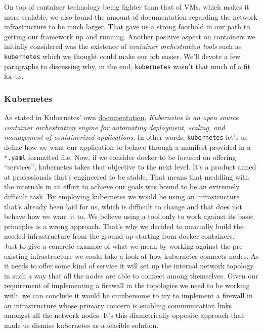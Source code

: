                 On top of container technology being lighter than that of VMs, which makes it more scalable, we also found the amount of documentation regarding the network infrastructure to be much larger. That gave us a strong foothold in our path to getting our framework up and running. Another positive aspect on containers we initially considered was the existence of \textit{container orchestration tools} such as \texttt{kubernetes} which we thought could make our job easier. We'll devote a few paragraphs to discussing why, in the end, \texttt{kubernetes} wasn't that much of a fit for us.

            \subsubsection{Kubernetes}
                As stated in Kubernetes' own \href{https://kubernetes.io/docs/home/}{documentation}, \textit{Kubernetes is an open source container orchestration engine for automating deployment, scaling, and management of containerized applications}. In other words, \texttt{kubernetes} let's us define how we want our application to behave through a manifest provided in a \texttt{*.yaml} formatted file. Now, if we consider docker to be focused on offering ``services'', kubernetes takes that objective to the next level. It's a product aimed at professionals that's engineered to be stable. That means that meddling with the internals in an effort to achieve our goals was bound to be an extremely difficult task. By employing kubernetes we would be using an infrastructure that's already been laid for us, which is difficult to change and that does not behave how we want it to. We believe using a tool only to work against its basic principles is a wrong approach. That's why we decided to manually build the needed infrastructure from the ground up starting from docker containers.\\

                Just to give a concrete example of what we mean by working against the pre-existing infrastructure we could take a look at how kubernetes connects nodes. As it needs to offer some kind of service it will set up the internal network topology in such a way that all the nodes are able to connect among themselves. Given our requirement of implementing a firewall in the topologies we need to be working with, we can conclude it would be cumbersome to try to implement a firewall in an infrastructure whose primary concern is enabling communication links amongst all the network nodes. It's this diametrically opposite approach that made us dismiss kubernetes as a feasible solution.\\

